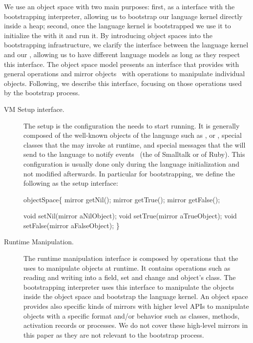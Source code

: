 We use an object space with two main purposes: first, as a \VM interface with the bootstrapping interpreter, allowing us to bootstrap our language kernel directly inside a \VM heap; second, once the language kernel is bootstrapped we use it to initialize the \VM with it and run it. By introducing object spaces into the bootstrapping infrastructure, we clarify the interface between the language kernel and our \VM, allowing us to have different language models as long as they respect this interface. The object space model presents an  interface that provides with general operations and mirror objects~\cite{Brac04b} with operations to manipulate individual objects. Following, we describe this interface, focusing on those operations used by the bootstrap process.

\begin{description}
\item[VM Setup interface.] The \VM setup is the configuration the \VM needs to start running. It is generally composed of the well-known objects of the language such as ,  or , special classes that the \VM may invoke at runtime, and special messages that the \VM will send to the language to notify events ~(\eg the  of Smalltalk or  of Ruby). This configuration is usually done only during the language initialization and not modified afterwards. In particular for bootstrapping, we define the following as the \VM setup interface:

\begin{code}
objectSpace\{
    mirror getNil();
    mirror getTrue();
    mirror getFalse();

    void setNil(mirror aNilObject);
    void setTrue(mirror aTrueObject);
    void setFalse(mirror aFalseObject);
\}
\end{code}

\item[Runtime Manipulation.] The runtime manipulation interface is composed by operations that the \VM uses to manipulate objects at runtime. It contains operations such as reading and writing into a field, set and change and object's class. The bootstrapping interpreter uses this interface to manipulate the objects inside the object space and bootstrap the language kernel. An object space provides also specific kinds of mirrors with higher level APIs to manipulate objects with a specific format and/or behavior such as classes, methods, activation records or processes. We do not cover these high-level mirrors in this paper as they are not relevant to the bootstrap process.


\end{description}
